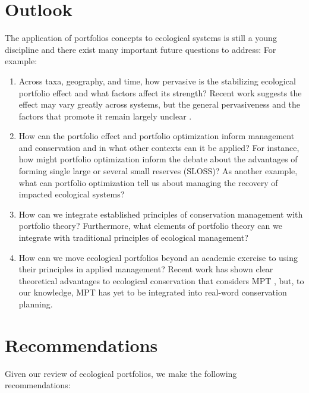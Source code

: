 \section{Outlook}\label{outlook}

The application of portfolios concepts to ecological systems is still a young discipline and there exist many important future questions to address: For example:

\begin{enumerate}
\def\labelenumi{\arabic{enumi}.}
\item
  Across taxa, geography, and time, how pervasive is the stabilizing ecological portfolio effect and what factors affect its strength? Recent work suggests the effect may vary greatly across systems, but the general pervasiveness and the factors that promote it remain largely unclear \citep[e.g.][]{anderson2013, mellin2014}.
\item
  How can the portfolio effect and portfolio optimization inform management and conservation and in what other contexts can it be applied? For instance, how might portfolio optimization inform the debate about the advantages of forming single large or several small reserves (SLOSS)? As another example, what can portfolio optimization tell us about managing the recovery of impacted ecological systems?
\item
  How can we integrate established principles of conservation management with portfolio theory? Furthermore, what elements of portfolio theory can we integrate with traditional principles of ecological management?
\item
  How can we move ecological portfolios beyond an academic exercise to using their principles in applied management? Recent work has shown clear theoretical advantages to ecological conservation that considers MPT \citep{crowe2008, ando2012, anderson2014}, but, to our knowledge, MPT has yet to be integrated into real-word conservation planning.
\end{enumerate}

\section{Recommendations}\label{recommendations}

Given our review of ecological portfolios, we make the following recommendations:

